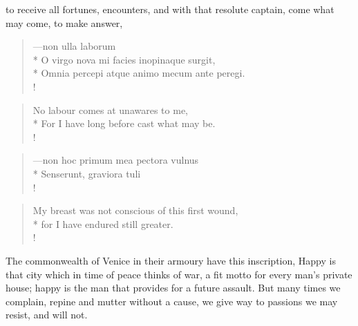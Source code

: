 {to receive all fortunes, encounters, and with that resolute captain,
come what may come, to make answer,
%
\begin{latin}%
\begin{verse}%
---non ulla laborum\\*
O virgo nova mi facies inopinaque surgit,\\*
Omnia percepi atque animo mecum ante peregi.\\!
\end{verse}%
\end{latin}%
\translationrule%
\begin{verse}%
No labour comes at unawares to me,\\*
For I have long before cast what may be.\\!
\end{verse}
%
\begin{latin}%
\begin{verse}%
---non hoc primum mea pectora vulnus\\*
Senserunt, graviora tuli\\!
\end{verse}%
\end{latin}%
\translationrule%
\begin{verse}%
My breast was not conscious of this first wound,\\*
for I have endured still greater.\\!
\end{verse}%
%
The commonwealth of Venice in their armoury have this
inscription, Happy is that city which in time of peace thinks of war, a
fit motto for every man's private house; happy is the man that provides
for a future assault. But many times we complain, repine and mutter
without a cause, we give way to passions we may resist, and will not.

}
